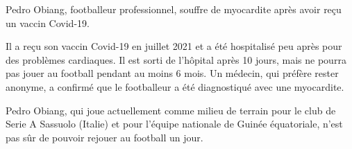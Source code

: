 Pedro Obiang, footballeur professionnel, souffre de myocardite après avoir reçu
un vaccin Covid-19.

Il a reçu son vaccin Covid-19 en juillet 2021 et a été hospitalisé peu après
pour des problèmes cardiaques. Il est sorti de l'hôpital après 10 jours, mais ne
pourra pas jouer au football pendant au moins 6 mois. Un médecin, qui préfère
rester anonyme, a confirmé que le footballeur a été diagnostiqué avec une
myocardite.

Pedro Obiang, qui joue actuellement comme milieu de terrain pour le club de
Serie A Sassuolo (Italie) et pour l'équipe nationale de Guinée équatoriale,
n'est pas sûr de pouvoir rejouer au football un jour.
